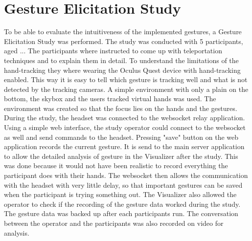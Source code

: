 


\section{Gesture Elicitation Study}
To be able to evaluate the intuitiveness of the implemented gestures, a Gesture Elicitation Study was performed. The study was conducted with 5 participants, aged ... The participants where instructed to come up with teleportation techniques and to explain them in detail. To understand the limitations of the hand-tracking they where wearing the Oculus Quest device with hand-tracking enabled. This way it is easy to tell which gesture is tracking well and what is not detected by the tracking cameras. A simple environment with only a plain on the bottom, the skybox and the users tracked virtual hands was used. The environment was created so that the focus lies on the hands and the gestures. During the study, the headset was connected to the websocket relay application. Using a simple web interface, the study operator could connect to the websocket as well and send commands to the headset. Pressing "save" button on the web application records the current gesture. It is send to the main server application to allow the detailed analysis of gesture in the Visualizer after the study. This was done because it would not have been realistic to record everything the participant does with their hands. The websocket then allows the communication with the headset with very little delay, so that important gestures can be saved when the participant is trying something out. The Visualizer also allowed the operator to check if the recording of the gesture data worked during the study. The gesture data was backed up after each participants run. The conversation between the operator and the participants was also recorded on video for analysis.
